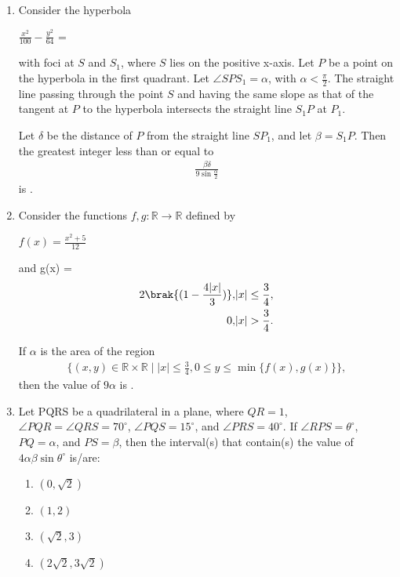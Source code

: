 \documentclass{article}
\begin{document}
\begin{enumerate}
\item Consider the hyperbola  
	
$\frac{x^2}{100} - \frac{y^2}{64}$ = 
	
with foci at $S$ and $S_1$, where $S$ lies on the positive x-axis. Let $P$ be a point on the hyperbola in the first quadrant. Let $\angle S P S_1 = \alpha$, with $\alpha < \frac{\pi}{2}$.  
The straight line passing through the point $S$ and having the same slope as that of the tangent at $P$ to the hyperbola intersects the straight line $S_1 P$ at $P_1$.  

Let $\delta$ be the distance of $P$ from the straight line $S P_1$, and let $\beta = S_1 P$.  
Then the greatest integer less than or equal to  
		\begin{align}
\frac{\beta \delta}{9 \sin \frac{\alpha}{2}}
		\end{align}
is \underline{   }.



\item Consider the functions $f, g : \mathbb{R} \to \mathbb{R}$ defined by  
	
$f(x) = \frac{x^2 + 5}{12}$
		
and  		
g(x) =
\begin{align} 
	2\brak{(1 - \frac{4|x|}{3} )}, & |x| \leq \frac{3}{4}, \\ 
0, & |x| > \frac{3}{4}.
\end{align}

If $\alpha$ is the area of the region  
\begin{align}
\{(x, y) \in \mathbb{R} \times \mathbb{R} \mid |x| \leq \frac{3}{4}, 0 \leq y \leq \min\{f(x), g(x)\} \},
\end{align}
then the value of $9\alpha$ is \underline{   }.

    

    \item Let PQRS be a quadrilateral in a plane, where $QR = 1$, $\angle PQR = \angle QRS = 70^\circ$, $\angle PQS = 15^\circ$, and $\angle PRS = 40^\circ$. If $\angle RPS = \theta^\circ$, $PQ = \alpha$, and $PS = \beta$, then the interval(s) that contain(s) the value of $4\alpha\beta\sin\theta^\circ$ is/are:

    \begin{enumerate}
        \item $(0, \sqrt{2})$
        \item $(1, 2)$
        \item $(\sqrt{2}, 3)$
        \item $(2\sqrt{2}, 3\sqrt{2})$
    \end{enumerate}




\end{enumerate}
\end{document}
